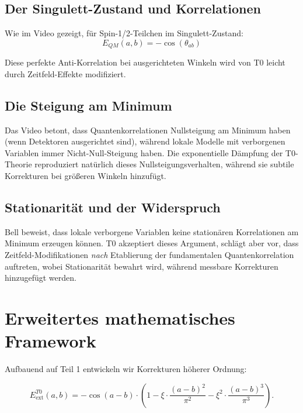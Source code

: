 \subsection{Der Singulett-Zustand und Korrelationen}

Wie im Video gezeigt, für Spin-1/2-Teilchen im Singulett-Zustand:
\begin{equation}
E_{QM}(a,b) = -\cos(\theta_{ab})
\end{equation}

Diese perfekte Anti-Korrelation bei ausgerichteten Winkeln wird von T0 leicht durch Zeitfeld-Effekte modifiziert.

\subsection{Die Steigung am Minimum}

Das Video betont, dass Quantenkorrelationen Nullsteigung am Minimum haben (wenn Detektoren ausgerichtet sind), während lokale Modelle mit verborgenen Variablen immer Nicht-Null-Steigung haben. Die exponentielle Dämpfung der T0-Theorie reproduziert natürlich dieses Nullsteigungsverhalten, während sie subtile Korrekturen bei größeren Winkeln hinzufügt.

\subsection{Stationarität und der Widerspruch}

Bell beweist, dass lokale verborgene Variablen keine stationären Korrelationen am Minimum erzeugen können. T0 akzeptiert dieses Argument, schlägt aber vor, dass Zeitfeld-Modifikationen \textit{nach} Etablierung der fundamentalen Quantenkorrelation auftreten, wobei Stationarität bewahrt wird, während messbare Korrekturen hinzugefügt werden.

\section{Erweitertes mathematisches Framework}
\label{sec:extended_math}

Aufbauend auf Teil 1 entwickeln wir Korrekturen höherer Ordnung:

\begin{equation}
E^{T0}_{\text{ext}}(a,b) = -\cos(a-b) \cdot \left(1 - \xi \cdot \frac{(a-b)^2}{\pi^2} - \xi^2 \cdot \frac{(a-b)^3}{\pi^3}\right).
\label{eq:cubic_expansion}
\end{equation}

